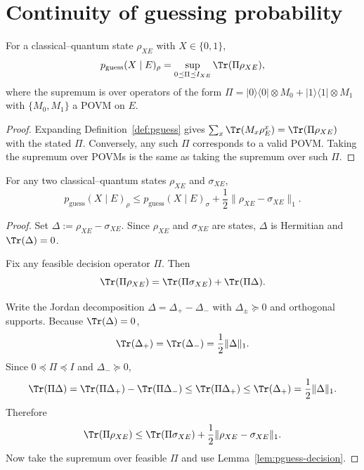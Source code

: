 \section{Continuity of guessing probability}

\begin{lemma}
\label{lem:pguess-decision}
\notready
For a classical--quantum state $\rho_{XE}$ with $X\in\{0,1\}$,
\[
 p_{\mathrm{guess}}(X\mid E)_\rho = \sup_{0\preceq \Pi\preceq I_{XE}} \Tr(\Pi\rho_{XE}),
\]
where the supremum is over operators of the form $\Pi=|0\rangle\!\langle 0|\otimes M_0 + |1\rangle\!\langle 1|\otimes M_1$ with $\{M_0,M_1\}$ a POVM on $E$.
\end{lemma}

\begin{proof}
Expanding Definition~\ref{def:pguess} gives $\sum_x\Tr(M_x\rho_E^x)=\Tr(\Pi\rho_{XE})$ with the stated $\Pi$. Conversely, any such $\Pi$ corresponds to a valid POVM. Taking the supremum over POVMs is the same as taking the supremum over such $\Pi$.
\end{proof}

\begin{lemma}
\label{lem:pguess-continuity}
\notready
For any two classical--quantum states $\rho_{XE}$ and $\sigma_{XE}$,
\[
 p_{\mathrm{guess}}(X\mid E)_\rho \le p_{\mathrm{guess}}(X\mid E)_\sigma + \frac12\|\rho_{XE}-\sigma_{XE}\|_1.
\]
\end{lemma}

\begin{proof}
Set $\Delta:=\rho_{XE}-\sigma_{XE}$. Since $\rho_{XE}$ and $\sigma_{XE}$ are states,
$\Delta$ is Hermitian and $\Tr(\Delta)=0$.

Fix any feasible decision operator $\Pi$. Then
\[
\Tr(\Pi\rho_{XE}) = \Tr(\Pi\sigma_{XE}) + \Tr(\Pi\Delta).
\]

Write the Jordan decomposition $\Delta=\Delta_+-\Delta_-$ with
$\Delta_\pm\succeq 0$ and orthogonal supports. Because $\Tr(\Delta)=0$,
\[
\Tr(\Delta_+)=\Tr(\Delta_-)=\frac12\|\Delta\|_1.
\]
Since $0\preceq \Pi\preceq I$ and $\Delta_-\succeq 0$,
\[
\Tr(\Pi\Delta)=\Tr(\Pi\Delta_+)-\Tr(\Pi\Delta_-)\le \Tr(\Pi\Delta_+)\le \Tr(\Delta_+)=\frac12\|\Delta\|_1.
\]
Therefore
\[
\Tr(\Pi\rho_{XE})\le \Tr(\Pi\sigma_{XE})+\frac12\|\rho_{XE}-\sigma_{XE}\|_1.
\]
Now take the supremum over feasible $\Pi$ and use Lemma~\ref{lem:pguess-decision}.
\end{proof}

